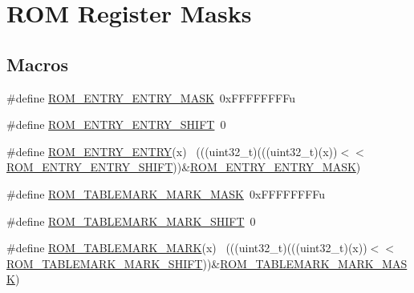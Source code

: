 \hypertarget{group___r_o_m___register___masks}{}\section{R\+OM Register Masks}
\label{group___r_o_m___register___masks}
\subsection*{Macros}
\begin{DoxyCompactItemize}
\item 
\#define \hyperlink{group___r_o_m___register___masks_ga1857448185c74895d4ba462f8ebd76a9}{R\+O\+M\+\_\+\+E\+N\+T\+R\+Y\+\_\+\+E\+N\+T\+R\+Y\+\_\+\+M\+A\+SK}~0x\+F\+F\+F\+F\+F\+F\+F\+Fu
\item 
\#define \hyperlink{group___r_o_m___register___masks_gaef045dcd4648ca2c223f191d1e013673}{R\+O\+M\+\_\+\+E\+N\+T\+R\+Y\+\_\+\+E\+N\+T\+R\+Y\+\_\+\+S\+H\+I\+FT}~0
\item 
\#define \hyperlink{group___r_o_m___register___masks_ga82d6b8222946f8fa04895a321c8668f5}{R\+O\+M\+\_\+\+E\+N\+T\+R\+Y\+\_\+\+E\+N\+T\+RY}(x)                                          ~(((uint32\+\_\+t)(((uint32\+\_\+t)(x))$<$$<$\hyperlink{group___r_o_m___register___masks_gaef045dcd4648ca2c223f191d1e013673}{R\+O\+M\+\_\+\+E\+N\+T\+R\+Y\+\_\+\+E\+N\+T\+R\+Y\+\_\+\+S\+H\+I\+FT}))\&\hyperlink{group___r_o_m___register___masks_ga1857448185c74895d4ba462f8ebd76a9}{R\+O\+M\+\_\+\+E\+N\+T\+R\+Y\+\_\+\+E\+N\+T\+R\+Y\+\_\+\+M\+A\+SK})
\item 
\#define \hyperlink{group___r_o_m___register___masks_gaac600c2f3e33e425e374ca4f843d63e6}{R\+O\+M\+\_\+\+T\+A\+B\+L\+E\+M\+A\+R\+K\+\_\+\+M\+A\+R\+K\+\_\+\+M\+A\+SK}~0x\+F\+F\+F\+F\+F\+F\+F\+Fu
\item 
\#define \hyperlink{group___r_o_m___register___masks_gaffb544cfa94716cfd71a99bb45c7411a}{R\+O\+M\+\_\+\+T\+A\+B\+L\+E\+M\+A\+R\+K\+\_\+\+M\+A\+R\+K\+\_\+\+S\+H\+I\+FT}~0
\item 
\#define \hyperlink{group___r_o_m___register___masks_ga32c876a462e51b17340d7611cf9d9236}{R\+O\+M\+\_\+\+T\+A\+B\+L\+E\+M\+A\+R\+K\+\_\+\+M\+A\+RK}(x)                                    ~(((uint32\+\_\+t)(((uint32\+\_\+t)(x))$<$$<$\hyperlink{group___r_o_m___register___masks_gaffb544cfa94716cfd71a99bb45c7411a}{R\+O\+M\+\_\+\+T\+A\+B\+L\+E\+M\+A\+R\+K\+\_\+\+M\+A\+R\+K\+\_\+\+S\+H\+I\+FT}))\&\hyperlink{group___r_o_m___register___masks_gaac600c2f3e33e425e374ca4f843d63e6}{R\+O\+M\+\_\+\+T\+A\+B\+L\+E\+M\+A\+R\+K\+\_\+\+M\+A\+R\+K\+\_\+\+M\+A\+SK})

\end{DoxyCompactItemize}
